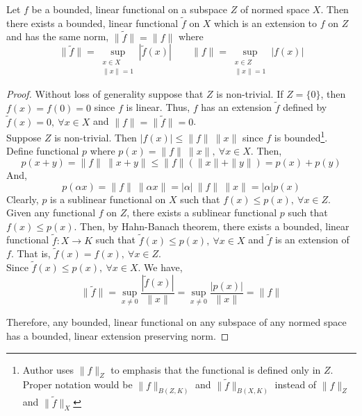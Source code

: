 \begin{theorem}
	Let $f$ be a bounded, linear functional on a subspace $Z$ of normed space $X$.
	Then there exists a bounded, linear functional $\tilde{f}$ on $X$ which is an extension to $f$ on $Z$ and has the same norm, $\|\tilde{f}\| = \|f\|$ where 
	\[ \|\tilde{f}\| = \sup_{\substack{x \in X\\ \|x\|=1}} |\tilde{f}(x)| \qquad \|f\| = \sup_{\substack{x \in Z\\\|x\| = 1}} |f(x)| \]
\end{theorem}
\begin{proof}
	Without loss of generality suppose that $Z$ is non-trivial.
	If $Z = \{ 0 \}$, then $f(x) = f(0) = 0$ since $f$ is linear.
	Thus, $f$ has an extension $\tilde{f}$ defined by $\tilde{f}(x) = 0,\ \forall x \in X$ and $\|f\| = \|\tilde{f}\| = 0$.\\
	
	Suppose $Z$ is non-trivial.
	Then $|f(x)| \le \|f\| \ \|x\|$ since $f$ is bounded\dag\footnote{
		Author uses $\|f\|_Z$ to emphasis that the functional is defined only in $Z$.
		Proper notation would be $\|f\|_{B(Z,K)}$ and $\| \tilde{f}\|_{B(X,K)}$ instead of $\|f\|_Z$ and $\|\tilde{f}\|_X$}.
	Define functional $p$ where $p(x) = \|f\| \ \|x\|,\ \forall x \in X$.
	Then,
	\[ p(x+y) = \|f\| \ \|x+y\| \le \|f\| (\|x\|+\|y\|) = p(x) + p(y) \]
	And,
	\[ p(\alpha x) = \|f\| \ \|\alpha x\| = |\alpha| \ \|f\| \ \|x\| = |\alpha| p(x) \]
	Clearly, $p$ is a sublinear functional on $X$ such that $f(x) \le p(x),\ \forall x \in Z$. \\

	Given any functional $f$ on $Z$, there exists a sublinear functional $p$ such that $f(x) \le p(x)$.
	Then, by Hahn-Banach theorem, there exists a bounded, linear functional $\tilde{f} : X \to K$ such that $\tilde{f}(x) \le p(x),\ \forall x \in X$ and $\tilde{f}$ is an extension of $f$.
	That is, $\tilde{f}(x) = f(x),\ \forall x \in Z$.\\
	
	Since $\tilde{f}(x) \le p(x), \ \forall x \in X$.
	We have, \[ \|\tilde{f}\| = \sup_{x \ne 0} \frac{|\tilde{f}(x)|}{\|x\|} = \sup_{x \ne 0} \frac{|p(x)|}{\|x\|} = \|f\| \]

	Therefore, any bounded, linear functional on any subspace of any normed space has a bounded, linear extension preserving norm.
\end{proof}

